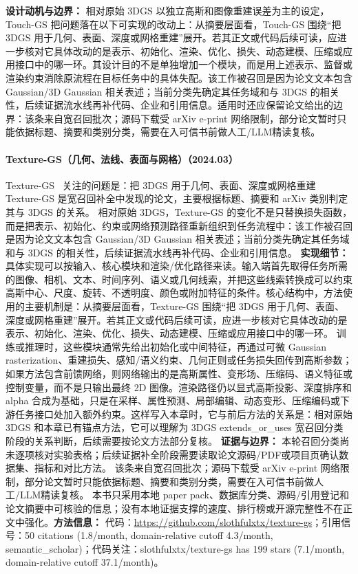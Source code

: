 \textbf{设计动机与边界：} 相对原始 3DGS 以独立高斯和图像重建误差为主的设定，Touch-GS 把问题落在以下可实现的改动上：从摘要层面看，Touch-GS 围绕“把 3DGS 用于几何、表面、深度或网格重建”展开。若其正文或代码后续可读，应进一步核对它具体改动的是表示、初始化、渲染、优化、损失、动态建模、压缩或应用接口中的哪一环。其设计目的不是单独增加一个模块，而是用上述表示、监督或渲染约束消除原流程在目标任务中的具体失配。该工作被召回是因为论文文本包含 Gaussian/3D Gaussian 相关表述；当前分类先确定其任务域和与 3DGS 的相关性，后续证据流水线再补代码、企业和引用信息。适用时还应保留论文给出的边界：该条来自宽召回批次；源码下载受 arXiv e-print 网络限制，部分论文暂时只能依据标题、摘要和类别分类，需要在入可信书前做人工/LLM精读复核。
\paragraph{Texture-GS（几何、法线、表面与网格）（2024.03）}
Texture-GS~\cite{2403_10050} 关注的问题是：把 3DGS 用于几何、表面、深度或网格重建 Texture-GS 是宽召回补全中发现的论文，主要根据标题、摘要和 arXiv 类别判定其与 3DGS 的关系。
相对原始 3DGS，Texture-GS 的变化不是只替换损失函数，而是把表示、初始化、约束或网络预测路径重新组织到任务流程中：该工作被召回是因为论文文本包含 Gaussian/3D Gaussian 相关表述；当前分类先确定其任务域和与 3DGS 的相关性，后续证据流水线再补代码、企业和引用信息。
\textbf{实现细节：} 具体实现可以按输入、核心模块和渲染/优化路径来读。输入端首先取得任务所需的图像、相机、文本、时间序列、语义或几何线索，并把这些线索转换成可以约束高斯中心、尺度、旋转、不透明度、颜色或附加特征的条件。核心结构中，方法使用的主要机制是：从摘要层面看，Texture-GS 围绕“把 3DGS 用于几何、表面、深度或网格重建”展开。若其正文或代码后续可读，应进一步核对它具体改动的是表示、初始化、渲染、优化、损失、动态建模、压缩或应用接口中的哪一环。 训练或推理时，这些模块通常先给出初始化或中间特征，再通过可微 Gaussian rasterization、重建损失、感知/语义约束、几何正则或任务损失回传到高斯参数；如果方法包含前馈网络，则网络输出的是高斯属性、变形场、压缩码、语义特征或控制变量，而不是只输出最终 2D 图像。渲染路径仍以显式高斯投影、深度排序和 alpha 合成为基础，只是在采样、属性预测、局部编辑、动态变形、压缩编码或下游任务接口处加入额外约束。这样写入本章时，它与前后方法的关系是：相对原始 3DGS 和本章已有锚点方法，它可以理解为 3DGS extends\_or\_uses 宽召回分类阶段的关系判断，后续需要按论文方法部分复核。
\textbf{证据与边界：} 本轮召回分类尚未逐项核对实验表格；后续证据补全阶段需要读取论文源码/PDF或项目页确认数据集、指标和对比方法。 该条来自宽召回批次；源码下载受 arXiv e-print 网络限制，部分论文暂时只能依据标题、摘要和类别分类，需要在入可信书前做人工/LLM精读复核。 本书只采用本地 paper pack、数据库分类、源码/引用登记和论文摘要中可核验的信息；没有本地证据支撑的速度、排行榜或开源完整性不在正文中强化。\textbf{方法信息：} 代码：\url{https://github.com/slothfulxtx/texture-gs}；引用信号：50 citations (1.8/month, domain-relative cutoff 4.3/month, semantic\_scholar)；代码关注：slothfulxtx/texture-gs has 199 stars (7.1/month, domain-relative cutoff 37.1/month)。
